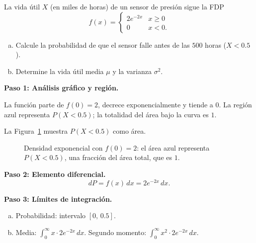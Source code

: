 \begin{example}
La vida útil $X$ (en miles de horas) de un sensor de presión sigue la FDP
\[
  f(x) = \begin{cases} 2e^{-2x} & x\geq 0 \\ 0 & x<0. \end{cases}
\]
\begin{enumerate}[(a)]
  \item Calcule la probabilidad de que el sensor falle antes de las $500$ horas ($X<0.5$).
  \item Determine la vida útil media $\mu$ y la varianza $\sigma^2$.
\end{enumerate}
\begin{myproof}
\textbf{Paso 1: Análisis gráfico y región.}

La función parte de $f(0)=2$, decrece exponencialmente y tiende a $0$. La región azul representa
$P(X<0.5)$; la totalidad del área bajo la curva es $1$.

La Figura~\ref{fig:densidad_probabilidad_intervalo} muestra $P(X<0.5)$ como área.

\begin{figure}[H]
\centering
{}
\caption{Densidad exponencial con $f(0)=2$: el área azul representa $P(X<0.5)$, una fracción del área total, que es $1$.}
\label{fig:densidad_probabilidad_intervalo}
\end{figure}

\textbf{Paso 2: Elemento diferencial.}
\[
  dP = f(x)\,dx = 2e^{-2x}\,dx.
\]

\textbf{Paso 3: Límites de integración.}
\begin{enumerate}[(a)]
  \item Probabilidad: intervalo $[0,\,0.5]$.
  \item Media: $\int_0^\infty x\cdot 2e^{-2x}\,dx$.\quad
        Segundo momento: $\int_0^\infty x^2\cdot 2e^{-2x}\,dx$.
\end{enumerate}


\end{myproof}
\end{example}
